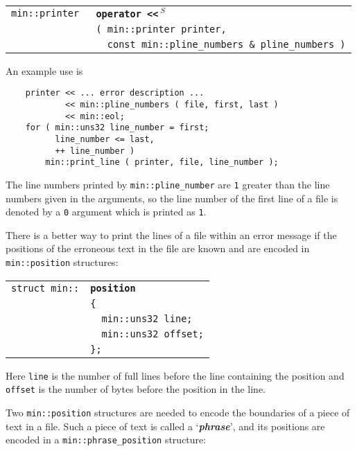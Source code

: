 \documentclass[12pt]{article}
\makeatletter
\newcommand{\TT}[1]{{\tt \bfseries #1}}
\newcommand{\key}[1]{{\bf \em #1}\index{#1}}
\newcommand{\ttindex}[1]{\index{#1@{\tt #1}}}
\newcommand{\ttmindex}[2]{\index{#1@{\tt #1}!#2}}
\newcommand{\ttomkey}[3]{\TT{operator #2}\index{#1@{\tt operator #2}!{#3}}}
\newcommand{\minindex}[1]{\ttindex{min::#1}\ttindex{#1}}
\newcommand{\EOL}{\penalty \exhyphenpenalty}
\newcommand{\LT}{{\tt <}}
\newenvironment{indpar}[1][0.3in]%
	{\begin{list}{}%
		     {\setlength{\itemsep}{0in}%
		      \setlength{\topsep}{0in}%
		      \setlength{\parsep}{1ex}%
		      \setlength{\labelwidth}{#1}%
		      \setlength{\leftmargin}{#1}%
		      \addtolength{\leftmargin}{\labelsep}}%
	 \item}%
	{\end{list}}
\newcommand{\LABEL}[1]{\label{#1}}
\newlength{\ARGBREAKLENGTH}
\newcommand{\ARGBREAK}[1][\ARGBREAKLENGTH]{\\&\hspace*{#1}}
\newcommand{\TTOMKEY}[3]{\ttomkey{#1}{#2}{#3}}
\newcommand{\MINKEY}[1]{{\tt \bf #1}\minindex{#1}}
\newcommand{\RESIZE}{$\,^S$}
\makeatother
\begin{document}
\begin{indpar}[1em]\begin{tabular}{r@{}l}
\verb|min::printer |
    & \TTOMKEY{<<}{\LT\LT\RESIZE}%
              {of {\tt min::printer}}\ARGBREAK
      \verb|( min::printer printer,|\ARGBREAK
      \verb|  const min::pline_numbers & pline_numbers )|
\LABEL{PRINTER_OPERATOR<<_OF_PLINE_NUMBERS} \\
\end{tabular}\end{indpar}

An example use is

\begin{indpar}\begin{verbatim}
    printer << ... error description ...
            << min::pline_numbers ( file, first, last )
            << min::eol;
    for ( min::uns32 line_number = first;
          line_number <= last,
          ++ line_number )
        min::print_line ( printer, file, line_number );
\end{verbatim}\end{indpar}

The line numbers printed by {\tt min::\EOL pline\_\EOL number}
are \verb|1| greater than the line numbers given in the arguments,
so the line number of the first line of a file is denoted by a
\verb|0| argument which is printed as \verb|1|.

There is a better way to print the lines of a file within an
error message if the positions of the erroneous text in the file
are known and are encoded in
\verb|min::position| structures:

\begin{indpar}[1em]\begin{tabular}{r@{}l}
\verb|struct min::| & \MINKEY{position}\ARGBREAK
    \verb|{|\ARGBREAK
    \verb|  min::uns32 line;|\ARGBREAK
    \verb|  min::uns32 offset;|\ARGBREAK
    \verb|};|
\ttmindex{line}{in {\tt min::position}}
\ttmindex{offset}{in {\tt min::position}}
\ttmindex{column}{in {\tt min::position}}
\LABEL{MIN::POSITION_STRUCT} \\
\end{tabular}\end{indpar}

Here \verb|line| is the number of full lines before the line
containing the position and \verb|offset| is the
number of bytes before the position in the line.

Two \verb|min::position| structures are needed to encode the boundaries
of a piece of text in a file.  Such a piece of text is called
a `\key{phrase}', and its positions are encoded in a
{\tt min::\EOL phrase\_\EOL position} structure:
\end{document}
